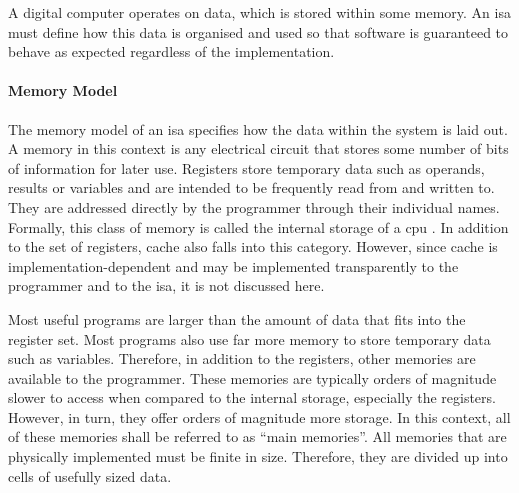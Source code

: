 A digital computer operates on data, which is stored within some memory. An \ac{isa} must define how this data is organised and used so that software is guaranteed to behave as expected regardless of the implementation.

\paragraph*{Memory Model} \label{sec:fundamentals_isa_memory_model}

The memory model of an \ac{isa} specifies how the data within the system is laid out. A memory in this context is any electrical circuit that stores some number of bits of information for later use. Registers store temporary data such as operands, results or variables and are intended to be frequently read from and written to. They are addressed directly by the programmer through their individual names. Formally, this class of memory is called the internal storage of a \ac{cpu} \cite{bryant2015computer}. In addition to the set of registers, cache also falls into this category. However, since cache is implementation-dependent and may be implemented transparently to the programmer and to the \ac{isa}, it is not discussed here.

Most useful programs are larger than the amount of data that fits into the register set. Most programs also use far more memory to store temporary data such as variables. Therefore, in addition to the registers, other memories are available to the programmer. These memories are typically orders of magnitude slower to access when compared to the internal storage, especially the registers. However, in turn, they offer orders of magnitude more storage. In this context, all of these memories shall be referred to as ``main memories''. All memories that are physically implemented must be finite in size. Therefore, they are divided up into cells of usefully sized data.

